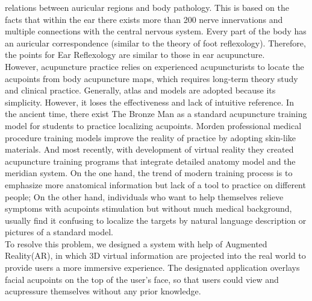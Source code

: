 relations between auricular regions and body pathology. This is based on the facts that within the ear there exists more than 200 nerve innervations and multiple connections with the central nervous system. Every part of the body has an auricular correspondence (similar to the theory of foot reflexology). Therefore, the points for Ear Reflexology are similar to those in ear acupuncture.\\
However, acupuncture practice relies on experienced acupuncturists to locate the acupoints from body acupuncture maps, which requires long-term theory study and clinical practice. Generally, atlas and models are adopted because its simplicity. However, it loses the effectiveness and lack of intuitive reference. In the ancient time, there exist The Bronze Man\cite{white2004brief} as a standard acupuncture training model for students to practice localizing acupoints. Morden professional medical procedure training models improve the reality of practice by adopting skin-like materials. And most recently, with development of virtual reality they created acupuncture training programs that integrate detailed anatomy model and the meridian system\cite{kanehira2008development}\cite{vrtrainingwebsite}. On the one hand, the trend of modern training process is to emphasize more anatomical information but lack of a tool to practice on different people; On the other hand, individuals who want to help themselves relieve symptoms with acupoints stimulation but without much medical background, usually find it confusing to localize the targets by natural language description or pictures of a standard model.\\
To resolve this problem, we designed a system with help of Augmented Reality(AR)\cite{azuma1997survey}, in which 3D virtual information are projected into the real world to provide users a more immersive experience. The designated application overlays facial acupoints on the top of the user’s face, so that users could view and acupressure themselves without any prior knowledge.\\



